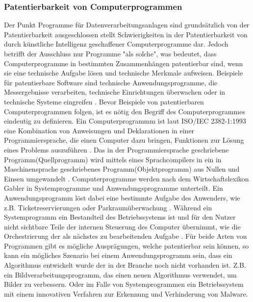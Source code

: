 \subsubsection{Patentierbarkeit von Computerprogrammen}
Der Punkt Programme für Datenverarbeitungsanlagen sind grundsätzlich
von der Patentierbarkeit ausgeschlossen stellt Schwierigkeiten in der 
Patentierbarkeit von durch künstliche
Intelligenz geschaffener Computerprogramme dar. 
Jedoch betrifft der Ausschluss nur Programme "als solche", 
was bedeutet, 
dass Computerprogramme in bestimmten Zusammenhängen patentierbar sind, 
wenn sie eine technische Aufgabe lösen und technische Merkmale aufweisen.
Beispiele für patentierbare Software sind technische Anwendungsprogramme, 
die Messergebnisse verarbeiten, 
technische Einrichtungen überwachen oder in technische Systeme eingreifen
\cite{RedekerITRechtSchutz}.
Bevor Beispiele von patentierbaren Computerprogrammen folgen, ist es
nötig den Begriff des Computerprogrammes eindeutig zu definieren.
Ein Computerprogrammm ist laut ISO/IEC 2382-1:1993 
eine Kombination von Anweisungen und Deklarationen in einer
Programmiersprache, die einen Computer dazu bringen, 
Funktionen zur Lösung eines Problems auszuführen 
\cite{instituteofelectricalandelectronicsengineersinc.ISO47652010}.
Das in der Programmiersprache geschriebene Programm(Quellprogramm) wird 
mittels eines Sprachcompilers in ein in Maschinensprache geschriebenes 
Programm(Objektprogramm) aus Nullen und Einsen umgewandelt \cite{WasIstProgramm}.
Computerprogramme werden nach dem Wirtschaftslexikon Gabler in Systemprogramme
und Anwendungsprogramme unterteilt. 
Ein Anwendungsprogramm löst dabei eine bestimmte Aufgabe des Anwenders, 
wie z.B. Ticketreservierungen oder Parkraumüberwachung 
\cite{lackesDefinitionAnwendungsprogramm}. 
Während ein Systemprogramm ein Bestandteil des Betriebssystems ist und 
für den Nutzer nicht sichtbare Teile der internen Steuerung des Computer übernimmt,
wie die Orchestrierung der als nächstes zu bearbeitenden Aufgabe \cite{lackesDefinitionSystemprogramm}.
Für beide Arten von Programmen gibt es mögliche Ausprägungen, 
welche patentierbar sein können, so kann ein mögliches Szenario bei einem Anwendungsprogramm sein,
dass ein Algorithmus entwickelt wurde der in der Branche noch nicht vorhanden ist. Z.B. ein
Bildverarbeitungsprogramm, das einen neuen Algorithmus verwendet, um Bilder zu verbessern.
Oder im Falle von Systemprogrammen ein Betriebssystem mit einem 
innovativen Verfahren zur Erkennung und Verhinderung von Malware.
